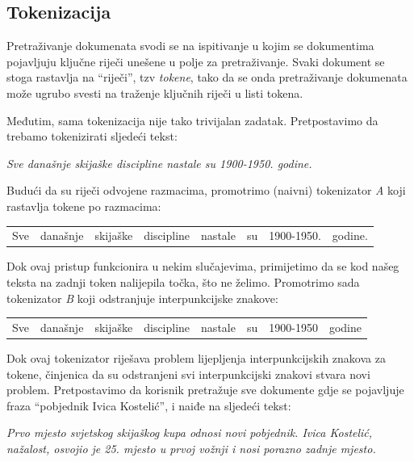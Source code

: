 \documentclass[a4paper,twoside,12pt]{scrreprt}
\newenvironment{nscenter}
 {\par\nopagebreak\centering}
 {\parskip=0pt\par\noindent\ignorespacesafterend}
\begin{document}
\subsection{Tokenizacija}

Pretraživanje dokumenata svodi se na ispitivanje u kojim se dokumentima pojavljuju ključne riječi unešene u polje za pretraživanje. Svaki dokument se stoga rastavlja na ``riječi'', tzv \textit{tokene}, tako da se onda pretraživanje dokumenata može ugrubo svesti na traženje ključnih riječi u listi tokena.

Međutim, sama tokenizacija nije tako trivijalan zadatak. Pretpostavimo da trebamo tokenizirati sljedeći tekst:

\begin{quoting}
  \textit{Sve današnje skijaške discipline nastale su 1900-1950. godine.}
\end{quoting}

Budući da su riječi odvojene razmacima, promotrimo (naivni) tokenizator \textit{A} koji rastavlja tokene po razmacima:

\begin{nscenter}
  \begin{tabular}{|c|c|c|c|c|c|c|c|}
    Sve & današnje & skijaške & discipline & nastale & su & 1900-1950. & godine.
  \end{tabular}
\end{nscenter}

Dok ovaj pristup funkcionira u nekim slučajevima, primijetimo da se kod našeg teksta na zadnji token nalijepila točka, što ne želimo. Promotrimo sada tokenizator \textit{B} koji odstranjuje interpunkcijske znakove:

\begin{nscenter}
  \begin{tabular}{|c|c|c|c|c|c|c|c|}
    Sve & današnje & skijaške & discipline & nastale & su & 1900-1950 & godine
  \end{tabular}
\end{nscenter}

Dok ovaj tokenizator riješava problem lijepljenja interpunkcijskih znakova za tokene, činjenica da su odstranjeni svi interpunkcijski znakovi stvara novi problem. Pretpostavimo da korisnik pretražuje sve dokumente gdje se pojavljuje fraza ``pobjednik Ivica Kostelić'', i naiđe na sljedeći tekst:

\begin{quoting}
  \textit{Prvo mjesto svjetskog skijaškog kupa odnosi novi pobjednik. Ivica Kostelić, nažalost, osvojio je 25. mjesto u prvoj vožnji i nosi porazno zadnje mjesto.}
\end{quoting}
\end{document}
